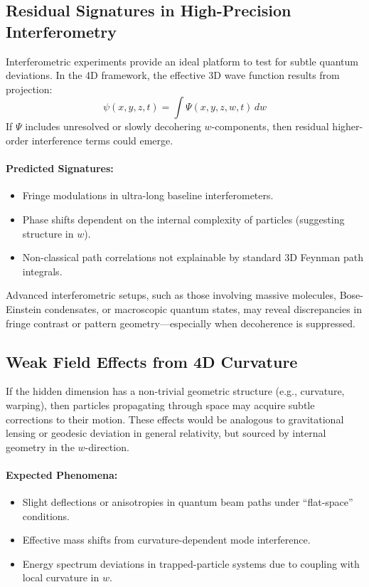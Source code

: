 \documentclass[12pt]{article}
\begin{document}
\subsection{Residual Signatures in High-Precision Interferometry}

Interferometric experiments provide an ideal platform to test for subtle quantum deviations. In the 4D framework, the effective 3D wave function results from projection:
\begin{equation}
\psi(x, y, z, t) = \int \Psi(x, y, z, w, t) \, dw
\end{equation}
If \( \Psi \) includes unresolved or slowly decohering \( w \)-components, then residual higher-order interference terms could emerge.

\paragraph{Predicted Signatures:}
\begin{itemize}
    \item Fringe modulations in ultra-long baseline interferometers.
    \item Phase shifts dependent on the internal complexity of particles (suggesting structure in \( w \)).
    \item Non-classical path correlations not explainable by standard 3D Feynman path integrals.
\end{itemize}

Advanced interferometric setups, such as those involving massive molecules, Bose-Einstein condensates, or macroscopic quantum states, may reveal discrepancies in fringe contrast or pattern geometry—especially when decoherence is suppressed.

\subsection{Weak Field Effects from 4D Curvature}

If the hidden dimension has a non-trivial geometric structure (e.g., curvature, warping), then particles propagating through space may acquire subtle corrections to their motion. These effects would be analogous to gravitational lensing or geodesic deviation in general relativity, but sourced by internal geometry in the \( w \)-direction.

\paragraph{Expected Phenomena:}
\begin{itemize}
    \item Slight deflections or anisotropies in quantum beam paths under “flat-space” conditions.
    \item Effective mass shifts from curvature-dependent mode interference.
    \item Energy spectrum deviations in trapped-particle systems due to coupling with local curvature in \( w \).
\end{itemize}
\end{document}
